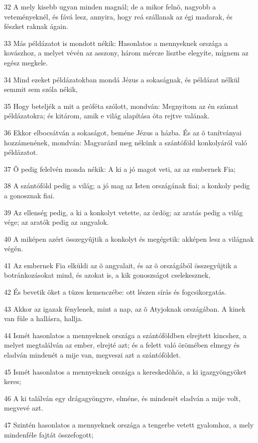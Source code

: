 \par 32 A mely kisebb ugyan minden magnál; de a mikor felnõ, nagyobb a veteményeknél, és fává lesz, annyira, hogy reá szállanak az égi madarak, és fészket raknak ágain.
\par 33 Más példázatot is mondott nékik: Hasonlatos a mennyeknek országa a kovászhoz, a melyet vévén az asszony, három mércze lisztbe elegyíte, mígnem az egész megkele.
\par 34 Mind ezeket példázatokban mondá Jézus a sokaságnak, és példázat nélkül semmit sem szóla nékik,
\par 35 Hogy beteljék a mit a próféta szólott, mondván: Megnyitom az én számat példázatokra; és kitárom, amik e világ alapítása óta rejtve valának.
\par 36 Ekkor elbocsátván a sokaságot, beméne Jézus a házba. És az õ tanítványai hozzámenének, mondván: Magyarázd meg nékünk a szántóföld konkolyáról való példázatot.
\par 37 Õ pedig felelvén monda nékik: A ki a jó magot veti, az az embernek Fia;
\par 38 A szántóföld pedig a világ; a jó mag az Isten országának fiai; a konkoly pedig a gonosznak fiai.
\par 39 Az ellenség pedig, a ki a konkolyt vetette, az ördög; az aratás pedig a világ vége; az aratók pedig az angyalok.
\par 40 A miképen azért összegyûjtik a konkolyt és megégetik: akképen lesz a világnak végén.
\par 41 Az embernek Fia elküldi az õ angyalait, és az õ országából összegyûjtik a botránkozásokat mind, és azokat is, a kik gonoszságot cselekesznek,
\par 42 És bevetik õket a tüzes kemenczébe: ott lészen sírás és fogcsikorgatás.
\par 43 Akkor az igazak fénylenek, mint a nap, az õ Atyjoknak országában. A kinek van füle a hallásra, hallja.
\par 44 Ismét hasonlatos a mennyeknek országa a szántóföldben elrejtett kincshez, a melyet megtalálván az ember, elrejté azt; és a felett való örömében elmegy és eladván mindenét a mije van, megveszi azt a szántóföldet.
\par 45 Ismét hasonlatos a mennyeknek országa a kereskedõhöz, a ki igazgyöngyöket keres;
\par 46 A ki találván egy drágagyöngyre, elméne, és mindenét eladván a mije volt, megvevé azt.
\par 47 Szintén hasonlatos a mennyeknek országa a tengerbe vetett gyalomhoz, a mely mindenféle fajtát összefogott;
